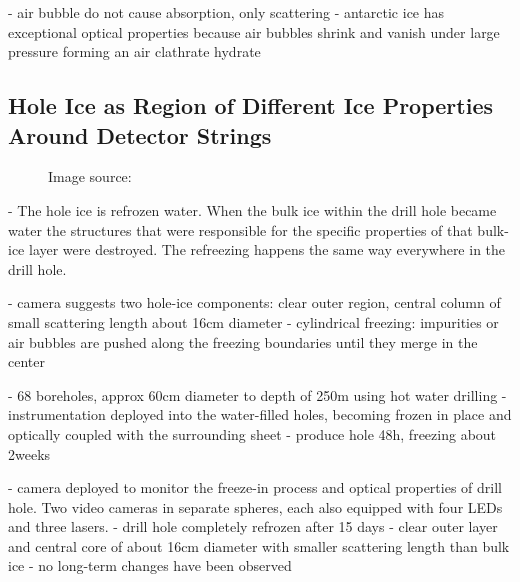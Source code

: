 - air bubble do not cause absorption, only scattering \cite{absorption1997}
- antarctic ice has exceptional optical properties because air bubbles shrink and vanish under large pressure forming an air clathrate hydrate \cite{rongenswedishcamera}


\subsection{Hole Ice as Region of Different Ice Properties Around Detector Strings}
\label{sec:hole_ice}

\begin{figure}[htbp]
  \caption{Image source: \cite{icrc17pocam}}
  \label{fig:label}
\end{figure}

- The hole ice is refrozen water. When the bulk ice within the drill hole became water the structures that were responsible for the specific properties of that bulk-ice layer were destroyed. The refreezing happens the same way everywhere in the drill hole.

- camera suggests two hole-ice components: clear outer region, central column of small scattering length about 16cm diameter \cite{rongenswedishcamera,instrumentation}
- cylindrical freezing: impurities or air bubbles are pushed along the freezing boundaries until they merge in the center \cite{rongenswedishcamera}

- 68 boreholes, approx 60cm diameter to depth of 250m using hot water drilling\cite{instrumentation}
- instrumentation deployed into the water-filled holes, becoming frozen in place and optically coupled with the surrounding sheet \cite{instrumentation}
- produce hole 48h, freezing about 2weeks \cite{instrumentation}

- camera deployed to monitor the freeze-in process and optical properties of drill hole. Two video cameras in separate spheres, each also equipped with four LEDs and three lasers. \cite{instrumentation}
- drill hole completely refrozen after 15 days \cite{instrumentation}
- clear outer layer and central core of about 16cm diameter with smaller scattering length than bulk ice\cite{instrumentation}
- no long-term changes have been observed \cite{instrumentation}

